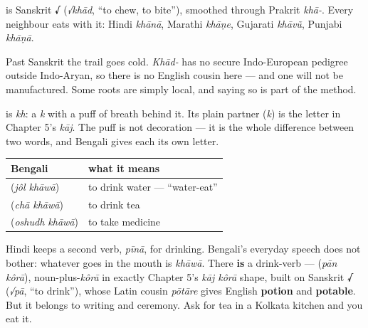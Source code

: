 \begin{cousinweb}
\textbf{} is Sanskrit \textbf{√} (\emph{√khād}, \textquotedblleft{}to chew, to bite\textquotedblright{}), smoothed through Prakrit \emph{khā-}. Every neighbour eats with it: Hindi \emph{khānā}, Marathi \emph{khāṇe}, Gujarati \emph{khāvũ}, Punjabi \emph{khāṇā}.

Past Sanskrit the trail goes cold. \emph{Khād-} has no secure Indo-European pedigree outside Indo-Aryan, so there is no English cousin here — and one will not be manufactured. Some roots are simply local, and saying so is part of the method.
\end{cousinweb}

\begin{sounds}
\textbf{} is \emph{kh}: a \emph{k} with a puff of breath behind it. Its plain partner \textbf{} (\emph{k}) is the letter in Chapter 5's \emph{kāj}. The puff is not decoration — it is the whole difference between two words, and Bengali gives each its own letter.
\end{sounds}

\begin{grammarlens}[title={Grammar Lens: Bengali eats its drinks}]
\noindent
\begin{tabularx}{\linewidth}{@{}>{\raggedright\arraybackslash}X>{\raggedright\arraybackslash}X@{}}
\toprule
\textbf{Bengali} & \textbf{what it means} \\
\midrule
\bn{জল} \bn{খাওয়া} (\emph{jôl khāwā}) & to drink water — \textquotedblleft{}water-eat\textquotedblright{} \\
\bn{চা} \bn{খাওয়া} (\emph{chā khāwā}) & to drink tea \\
\bn{ওষুধ} \bn{খাওয়া} (\emph{oshudh khāwā}) & to take medicine \\
\bottomrule
\end{tabularx}

Hindi keeps a second verb, \emph{pīnā}, for drinking. Bengali's everyday speech does not bother: whatever goes in the mouth is \emph{khāwā}. There \textbf{is} a drink-verb —   (\emph{pān kôrā}), noun-plus-\emph{kôrā} in exactly Chapter 5's \emph{kāj kôrā} shape, built on Sanskrit \textbf{√} (\emph{√pā}, \textquotedblleft{}to drink\textquotedblright{}), whose Latin cousin \emph{pōtāre} gives English \textbf{potion} and \textbf{potable}. But it belongs to writing and ceremony. Ask for tea in a Kolkata kitchen and you eat it.
\end{grammarlens}

